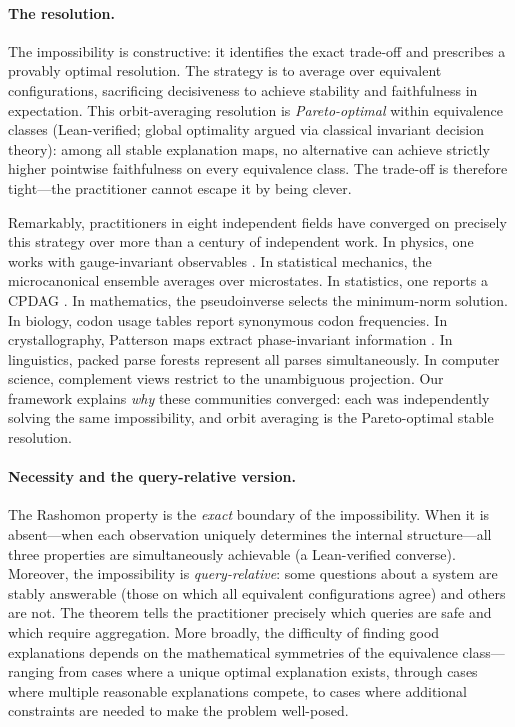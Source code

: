 \documentclass[11pt]{article}
\begin{document}
\paragraph{The resolution.}
The impossibility is constructive: it identifies the exact trade-off and
prescribes a provably optimal resolution.  The strategy is to average over
equivalent configurations, sacrificing decisiveness to achieve stability and
faithfulness in expectation.  This orbit-averaging resolution
is \emph{Pareto-optimal} within equivalence classes (Lean-verified; global
optimality argued via classical invariant decision theory): among all stable
explanation maps, no alternative can achieve strictly higher pointwise
faithfulness on every equivalence class.
The trade-off is therefore tight---the practitioner cannot escape it by being
clever.

Remarkably, practitioners in eight independent fields have converged on
precisely this strategy over more than a century of independent work.
In physics, one works with gauge-invariant observables \citep{jackson1999}.
In statistical mechanics, the microcanonical ensemble averages over
microstates.
In statistics, one reports a CPDAG \citep{verma1991equivalence}.
In mathematics, the pseudoinverse selects the minimum-norm solution.
In biology, codon usage tables report synonymous codon frequencies.
In crystallography, Patterson maps extract phase-invariant information
\citep{hauptman1953solution}.
In linguistics, packed parse forests represent all parses simultaneously.
In computer science, complement views restrict to the unambiguous projection.
Our framework explains \emph{why} these communities converged: each was
independently solving the same impossibility, and orbit averaging is the
Pareto-optimal stable resolution.

\paragraph{Necessity and the query-relative version.}
The Rashomon property is the \emph{exact} boundary of the impossibility.
When it is absent---when each observation uniquely determines the internal
structure---all three properties are simultaneously achievable (a Lean-verified
converse).  Moreover, the impossibility is \emph{query-relative}: some
questions about a system are stably answerable (those on which all
equivalent configurations agree) and others are not.  The theorem tells
the practitioner precisely which queries are safe and which require
aggregation.  More broadly, the difficulty of finding good explanations depends on the
mathematical symmetries of the equivalence class---ranging from cases
where a unique optimal explanation exists, through cases where multiple
reasonable explanations compete, to cases where additional constraints
are needed to make the problem well-posed.
\end{document}
